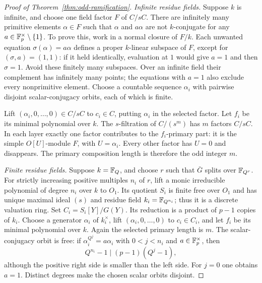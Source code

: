 \begin{proof}[Proof of Theorem~\ref{thm:odd-ramification}]
\emph{Infinite residue fields.}
Suppose $k$ is infinite, and choose one field factor $F$ of $C/sC$.
There are infinitely many primitive elements $\alpha\in F$ such
that $\alpha$ and $a\alpha$ are not $k$-conjugate for any
$a\in\mathbb F_p^\times\setminus\{1\}$.
To prove this, work in a normal closure of $F/k$.
Each unwanted equation $\sigma(\alpha)=a\alpha$ defines a proper
$k$-linear subspace of $F$, except for $(\sigma,a)=(1,1)$:
if it held identically, evaluation at $1$ would give $a=1$ and then
$\sigma=1$.
Avoid these finitely many subspaces.  Over an infinite field their
complement has infinitely many points; the equations with $a=1$
also exclude every nonprimitive element.
Choose a countable sequence $\alpha_i$ with pairwise disjoint
scalar-conjugacy orbits, each of which is finite.

Lift $(\alpha_i,0,\ldots,0)\in C/sC$ to $c_i\in C$, putting
$\alpha_i$ in the selected factor.  Let $f_i$ be its minimal
polynomial over $k$.
The $s$-filtration of $C/(s^m)$ has $m$ factors $C/sC$.
In each layer exactly one factor contributes to the $f_i$-primary
part: it is the simple $O[U]$-module $F$, with $U=\alpha_i$.
Every other factor has $U=0$ and disappears.
The primary composition length is therefore the odd integer $m$.

\emph{Finite residue fields.}
Suppose $k=\mathbb F_Q$, and choose $r$ such that $\bar G$ splits over
$\mathbb F_{Q^r}$.
For strictly increasing positive multiples $n_i$ of $r$, lift a
monic irreducible polynomial of degree $n_i$ over $k$ to $O_1$.
Its quotient $S_i$ is finite free over $O_1$ and has unique maximal
ideal $(s)$ and residue field $k_i=\mathbb F_{Q^{n_i}}$; thus it is a
discrete valuation ring.
Set $C_i=S_i[Y]/G(Y)$.
Its reduction is a product of $p-1$ copies of $k_i$.
Choose a generator $\alpha_i$ of $k_i^\times$, lift
$(\alpha_i,0,\ldots,0)$ to $c_i\in C_i$, and let $f_i$ be its
minimal polynomial over $k$.
Again the selected primary length is $m$.
The scalar-conjugacy orbit is free: if
$\alpha_i^{Q^j}=a\alpha_i$ with $0<j<n_i$ and $a\in\mathbb F_p^\times$,
then
\[
 Q^{n_i}-1\mid(p-1)(Q^j-1),
\]
although the positive right side is smaller than the left side.
For $j=0$ one obtains $a=1$.
Distinct degrees make the chosen scalar orbits disjoint.


\end{proof}
